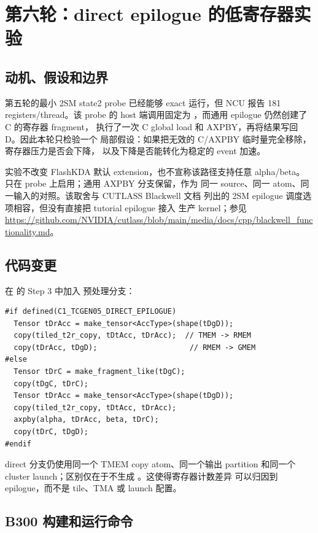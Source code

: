 \section{第六轮：direct epilogue 的低寄存器实验}

\subsection{动机、假设和边界}

第五轮的最小 2SM state2 probe 已经能够 exact 运行，但 NCU 报告
181 registers/thread。该 probe 的 host 端调用固定为
，而通用 epilogue 仍然创建了 C 的寄存器 fragment，
执行了一次 C global load 和 AXPBY，再将结果写回 D。因此本轮只检验一个
局部假设：如果把无效的 C/AXPBY 临时量完全移除，寄存器压力是否会下降，
以及下降是否能转化为稳定的 event 加速。

实验不改变 FlashKDA 默认 extension，也不宣称该路径支持任意 alpha/beta。
 只在
 probe 上启用；通用 AXPBY 分支保留，作为
同一 source、同一 atom、同一输入的对照。该取舍与 CUTLASS Blackwell 文档
列出的 2SM epilogue 调度选项相容，但没有直接把 tutorial epilogue 接入
生产 kernel；参见
\url{https://github.com/NVIDIA/cutlass/blob/main/media/docs/cpp/blackwell_functionality.md}。

\subsection{代码变更}

在  的 Step 3 中加入
预处理分支：

\begin{lstlisting}
#if defined(C1_TCGEN05_DIRECT_EPILOGUE)
  Tensor tDrAcc = make_tensor<AccType>(shape(tDgD));
  copy(tiled_t2r_copy, tDtAcc, tDrAcc);  // TMEM -> RMEM
  copy(tDrAcc, tDgD);                     // RMEM -> GMEM
#else
  Tensor tDrC = make_fragment_like(tDgC);
  copy(tDgC, tDrC);
  Tensor tDrAcc = make_tensor<AccType>(shape(tDgD));
  copy(tiled_t2r_copy, tDtAcc, tDrAcc);
  axpby(alpha, tDrAcc, beta, tDrC);
  copy(tDrC, tDgD);
#endif
\end{lstlisting}

direct 分支仍使用同一个 TMEM copy atom、同一个输出 partition 和同一个
cluster launch；区别仅在于不生成 。这使得寄存器计数差异
可以归因到 epilogue，而不是 tile、TMA 或 launch 配置。

\subsection{B300 构建和运行命令}

